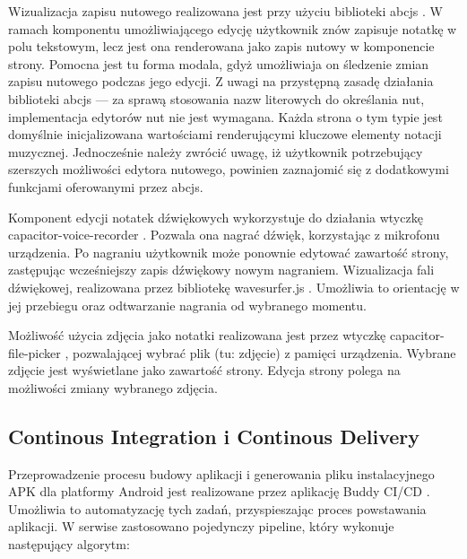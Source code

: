 Wizualizacja zapisu nutowego realizowana jest przy użyciu biblioteki abcjs \cite{abcjs}. W ramach komponentu umożliwiającego edycję
użytkownik znów zapisuje notatkę w polu tekstowym, lecz jest ona renderowana jako zapis nutowy w komponencie strony.
Pomocna jest tu forma modala,
gdyż umożliwiaja on śledzenie zmian zapisu nutowego podczas jego edycji. Z uwagi na przystępną zasadę działania biblioteki
abcjs — za sprawą stosowania nazw literowych do określania nut, implementacja edytorów nut nie jest wymagana.
Każda strona o tym typie jest domyślnie inicjalizowana wartościami renderującymi kluczowe elementy notacji muzycznej.
Jednocześnie należy zwrócić uwagę, iż użytkownik potrzebujący szerszych możliwości edytora nutowego, powinien zaznajomić
się z dodatkowymi funkcjami oferowanymi przez abcjs.

Komponent edycji notatek dźwiękowych wykorzystuje do działania wtyczkę capacitor-voice-recorder \cite{vr}. Pozwala ona nagrać
dźwięk, korzystając z mikrofonu urządzenia. Po nagraniu użytkownik może ponownie edytować zawartość strony, zastępując
wcześniejszy zapis dźwiękowy nowym nagraniem. Wizualizacja fali dźwiękowej, realizowana przez bibliotekę wavesurfer.js \cite{wavesurfer}.
Umożliwia to orientację w jej przebiegu oraz odtwarzanie nagrania od wybranego momentu.

Możliwość użycia zdjęcia jako notatki realizowana jest przez wtyczkę capacitor-file-picker \cite{plugins},
pozwalającej wybrać plik (tu: zdjęcie) z pamięci urządzenia. Wybrane zdjęcie jest wyświetlane jako zawartość strony.
Edycja strony polega na możliwości zmiany wybranego zdjęcia.

\subsection{Continous Integration i Continous Delivery}
Przeprowadzenie procesu budowy aplikacji i generowania pliku instalacyjnego APK dla platformy Android jest realizowane przez aplikację
Buddy CI/CD \cite{buddy}. Umożliwia to automatyzację tych zadań, przyspieszając proces powstawania aplikacji.
W serwise zastosowano pojedynczy pipeline, który wykonuje następujący algorytm:

